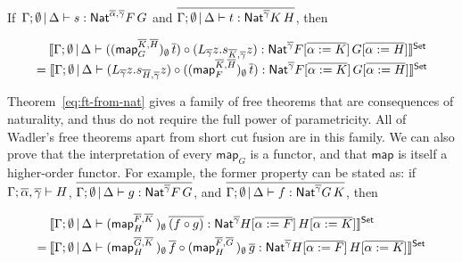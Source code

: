 \documentclass[runningheads]{llncs}
\newcommand{\map}{\mathsf{map}}
\begin{document}
  \vspace*{-0.1in}
  
\begin{theorem}\label{eq:ft-from-nat} 
  If\, $\Gamma; \emptyset \,|\, \Delta \vdash s : \mathsf{Nat}^{\overline{\alpha},
  \overline{\gamma}} F\,G$ and $\overline{\Gamma; \emptyset \,|\,
  \Delta \vdash t : \mathsf{Nat}^{\overline{\gamma}} K\, H}$, then

    \vspace*{-0.25in}
  
  \[\begin{array}{l}
  \hspace*{0.135in}
\setsem{\Gamma; \emptyset\,|\, \Delta
  \vdash 
  ((\map_G^{\overline{K}, \overline{H}})_\emptyset \,\overline{t}) \circ
(L_{\overline{\gamma}} z. s_{\overline{K}, \overline{\gamma}}
  z)
  : \Nat^{\overline{\gamma}} F[\overline{\alpha := K}]\,
  G[\overline{\alpha := H}]}\\
= \setsem{ \Gamma; \emptyset \,|\, \Delta \vdash
(L_{\overline{\gamma}} z.
  s_{\overline{H}, \overline{\gamma}} z)\circ
  ((\map_F^{\overline{K}, \overline{H}})_\emptyset \,
  \overline{t})  : \Nat^{\overline{\gamma}} F[\overline{\alpha :=
      K}]\, G[\overline{\alpha := H}]}
\end{array}\]
\end{theorem}

\vspace*{-0.1in}
  
\noindent
Theorem~\ref{eq:ft-from-nat} gives a family of free theorems that are
consequences of naturality, and thus do not require the full power of
parametricity. All of Wadler's free theorems apart from short cut
fusion are in this family. We can also prove that the interpretation
of every $\map_G$ is a functor, and that $\map$ is itself a
higher-order functor. For example, the former property can be stated as:
  if 
$\Gamma; \overline{\alpha}, \overline{\gamma} \vdash H$, 
  $\overline{\Gamma; \emptyset \,|\, \Delta \vdash g : \mathsf{Nat}^{\overline{\gamma}} F \, G}$, and
  $\overline{\Gamma; \emptyset \,|\, \Delta \vdash f : \mathsf{Nat}^{\overline{\gamma}} G \, K}$, then

  \vspace*{-0.2in}
  
  \begin{align*}
&\setsem{
\Gamma; \emptyset \,|\, \Delta \vdash 
  (\map^{\ol{F}, \ol{K}}_H \,)_{\emptyset} \, \ol{(f \circ g)}
  : \Nat^{\ol\gamma} H[\ol{\alpha := F}] \, H[\ol{\alpha := K}]} \\ 
= \hspace{0.03in} 
  &\setsem{
  \Gamma; \emptyset \,|\, \Delta \vdash 
  (\map^{\ol{G}, \ol{K}}_H \,)_{\emptyset} \, \ol{f} \circ 
  (\map^{\ol{F}, \ol{G}}_H \,)_{\emptyset} \, \ol{g}
  : \Nat^{\ol\gamma} H[\ol{\alpha := F}] \, H[\ol{\alpha := K}]}
\end{align*}
\end{document}
